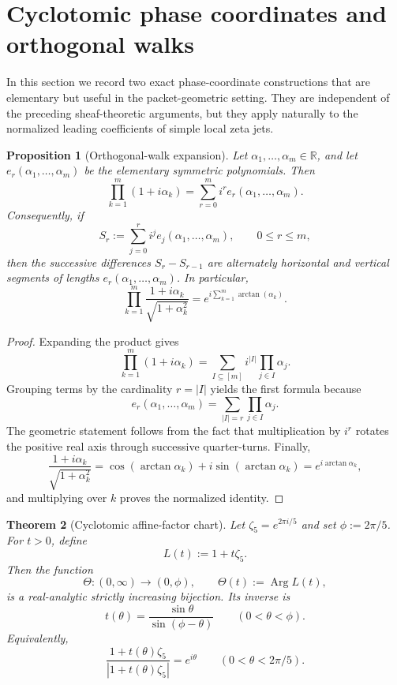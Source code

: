 \documentclass[11pt,a4paper]{article}
\numberwithin{equation}{section}
\newtheorem{theorem}{Theorem}[section]
\newtheorem{proposition}[theorem]{Proposition}
\theoremstyle{definition}
\theoremstyle{remark}
\DeclareMathOperator{\Arg}{Arg}
\newcommand{\RR}{\mathbb R}
\begin{document}
\section{Cyclotomic phase coordinates and orthogonal walks}\label{P1:sec:tobley}

In this section we record two exact phase-coordinate constructions that are elementary but useful in the packet-geometric setting.  They are independent of the preceding sheaf-theoretic arguments, but they apply naturally to the normalized leading coefficients of simple local zeta jets.

\begin{proposition}[Orthogonal-walk expansion]\label{P1:prop:orthogonal-walk}
Let $\alpha_1,\dots,\alpha_m\in\RR$, and let $e_r(\alpha_1,\dots,\alpha_m)$ be the elementary symmetric polynomials.  Then
\[
\prod_{k=1}^m (1+i\alpha_k)=\sum_{r=0}^m i^r e_r(\alpha_1,\dots,\alpha_m).
\]
Consequently, if
\[
S_r:=\sum_{j=0}^r i^j e_j(\alpha_1,\dots,\alpha_m),
\qquad 0\le r\le m,
\]
then the successive differences $S_r-S_{r-1}$ are alternately horizontal and vertical segments of lengths $e_r(\alpha_1,\dots,\alpha_m)$.  In particular,
\[
\prod_{k=1}^m \frac{1+i\alpha_k}{\sqrt{1+\alpha_k^2}}
=e^{i\sum_{k=1}^m\arctan(\alpha_k)}.
\]
\end{proposition}

\begin{proof}
Expanding the product gives
\[
\prod_{k=1}^m(1+i\alpha_k)=\sum_{I\subseteq [m]} i^{|I|}\prod_{j\in I}\alpha_j.
\]
Grouping terms by the cardinality $r=|I|$ yields the first formula because
\[
e_r(\alpha_1,\dots,\alpha_m)=\sum_{|I|=r}\prod_{j\in I}\alpha_j.
\]
The geometric statement follows from the fact that multiplication by $i^r$ rotates the positive real axis through successive quarter-turns.  Finally,
\[
\frac{1+i\alpha_k}{\sqrt{1+\alpha_k^2}}
=\cos(\arctan\alpha_k)+i\sin(\arctan\alpha_k)
=e^{i\arctan\alpha_k},
\]
and multiplying over $k$ proves the normalized identity.
\end{proof}

\begin{theorem}[Cyclotomic affine-factor chart]\label{P1:thm:cyclotomic-chart}
Let $\zeta_5=e^{2\pi i/5}$ and set $\phi:=2\pi/5$.  For $t>0$, define
\[
L(t):=1+t\zeta_5.
\]
Then the function
\[
\Theta:(0,\infty)\to(0,\phi),\qquad \Theta(t):=\Arg L(t),
\]
is a real-analytic strictly increasing bijection.  Its inverse is
\[
t(\theta)=\frac{\sin\theta}{\sin(\phi-\theta)}
\qquad (0<\theta<\phi).
\]
Equivalently,
\[
\frac{1+t(\theta)\zeta_5}{|1+t(\theta)\zeta_5|}=e^{i\theta}
\qquad (0<\theta<2\pi/5).
\]
\end{theorem}
\end{document}

